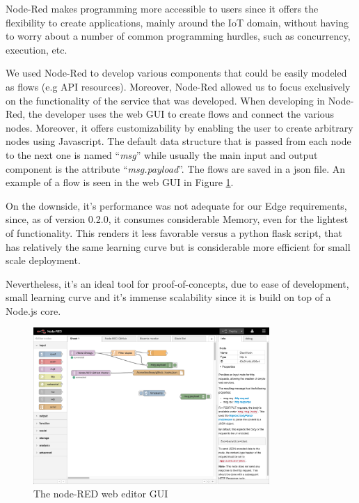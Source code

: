 Node-Red makes programming more accessible to users since it offers the flexibility to create applications, mainly around the IoT domain, without having to worry about a number of common programming hurdles, such as concurrency, execution, etc.  

We used Node-Red to develop various components that could be easily modeled as flows (e.g API resources). Moreover, Node-Red allowed us to focus exclusively on the functionality of the service that was developed. When developing in Node-Red, the developer uses the web GUI to create flows and connect the various nodes. Moreover, it offers customizability by enabling the user to create arbitrary nodes using Javascript. The default data structure that is passed from each node to the next one is named “\textit{msg}” while usually the main input and output component is the attribute “\textit{msg.payload}”. The flows are saved in a json file. An example of a flow is seen in the web GUI  in Figure \ref{fig:nodered}.

On the downside, it’s performance was not adequate for our Edge requirements, since, as of version 0.2.0, it consumes considerable Memory, even for the lightest of functionality. This renders it less favorable versus a python flask script, that has relatively the same learning curve but is considerable more efficient for small scale deployment.

Nevertheless, it’s an ideal tool for proof-of-concepts, due to ease of development, small learning curve and it's immense scalability since it is build on top of a Node.js core.

\begin{figure}[H]
    \centering
    \includegraphics[width=0.8\textwidth]{images/nodered_gui.png}
    \caption{The node-RED web editor GUI \cite{nodered}}
    \label{fig:nodered}
\end{figure}
\newpage


